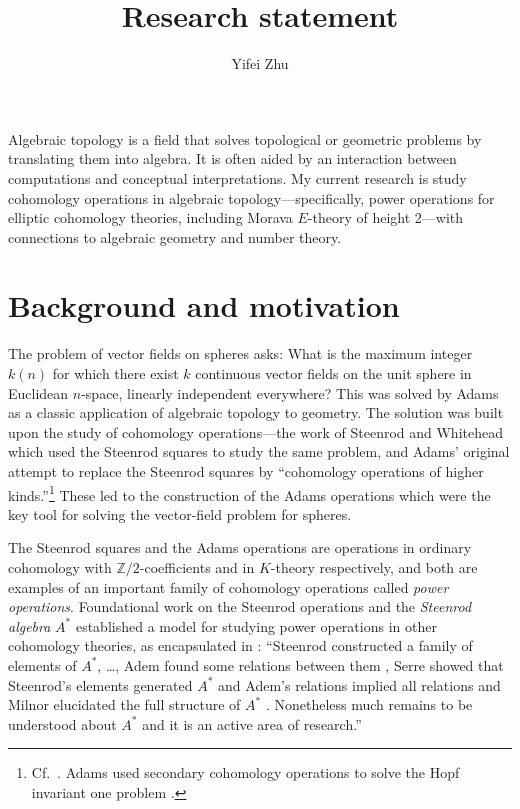 \documentclass{rs}
\title{Research statement}
\author{Yifei Zhu}
\theoremstyle{definition}
\theoremstyle{remark}
\newcommand{\mb}[1]{\mathbb{#1}}
\newcommand{\BZ}{{\mb Z}}
\begin{document}


\maketitle

Algebraic topology is a field that solves topological or geometric problems by translating them into algebra.  
It is often aided by an interaction between computations and conceptual interpretations.  
My current research is study cohomology operations in algebraic topology---specifically, 
power operations for elliptic cohomology theories, including Morava $E$-theory of height 2---with connections to algebraic geometry and number theory.  

\section{Background and motivation}
\label{sec:intro}

The problem of vector fields on spheres asks: 
What is the maximum integer $k(n)$ for which there exist $k$ continuous vector fields on the unit sphere in Euclidean $n$-space, 
linearly independent everywhere?  
This was solved by Adams \cite{adamsvector} as a classic application of algebraic topology to geometry.  
The solution was built upon the study of cohomology operations---the work of Steenrod and Whitehead \cite{steenrodwhitehead} 
which used the Steenrod squares to study the same problem, 
and Adams' original attempt to replace the Steenrod squares by 
``cohomology operations of higher kinds.''\footnote{Cf.~\cite[Section 2]{adamsvector}.  
Adams used secondary cohomology operations to solve the Hopf invariant one problem \cite{adamshopf}.  }  
These led to the construction of the Adams operations which were the key tool for solving the vector-field problem for spheres.  

The Steenrod squares and the Adams operations are operations in ordinary cohomology with $\BZ/2$-coefficients and in $K$-theory respectively, 
and both are examples of an important family of cohomology operations called {\em power operations}.  
Foundational work on the Steenrod operations and the {\em Steenrod algebra} $A^*$ 
established a model for studying power operations in other cohomology theories, as encapsulated in \cite[Section 1]{blind}: 
``Steenrod constructed a family of elements of $A^*$, \ldots \cite{steenrod}, 
Adem found some relations between them \cite{adem}, 
Serre showed that Steenrod's elements generated $A^*$ and Adem's relations implied all relations \cite{serre} 
and Milnor elucidated the full structure of $A^*$ \cite{milnor}.  
Nonetheless much remains to be understood about $A^*$ and it is an active area of research.''  
\end{document}
